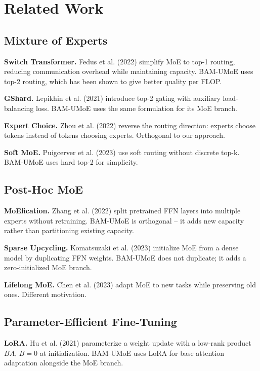 \section{Related Work}

\subsection{Mixture of Experts}

\textbf{Switch Transformer.} Fedus et al. (2022) simplify MoE to top-1 routing, 
reducing communication overhead while maintaining capacity. BAM-UMoE uses 
top-2 routing, which has been shown to give better quality per FLOP.

\textbf{GShard.} Lepikhin et al. (2021) introduce top-2 gating with auxiliary 
load-balancing loss. BAM-UMoE uses the same formulation for its MoE branch.

\textbf{Expert Choice.} Zhou et al. (2022) reverse the routing direction: experts 
choose tokens instead of tokens choosing experts. Orthogonal to our approach.

\textbf{Soft MoE.} Puigcerver et al. (2023) use soft routing without discrete 
top-k. BAM-UMoE uses hard top-2 for simplicity.

\subsection{Post-Hoc MoE}

\textbf{MoEfication.} Zhang et al. (2022) split pretrained FFN layers into 
multiple experts without retraining. BAM-UMoE is orthogonal -- it adds new 
capacity rather than partitioning existing capacity.

\textbf{Sparse Upcycling.} Komatsuzaki et al. (2023) initialize MoE from a dense 
model by duplicating FFN weights. BAM-UMoE does not duplicate; it adds 
a zero-initialized MoE branch.

\textbf{Lifelong MoE.} Chen et al. (2023) adapt MoE to new tasks while preserving 
old ones. Different motivation.

\subsection{Parameter-Efficient Fine-Tuning}

\textbf{LoRA.} Hu et al. (2021) parameterize a weight update with a low-rank 
product $BA$, $B = 0$ at initialization. BAM-UMoE uses LoRA for base 
attention adaptation alongside the MoE branch.


